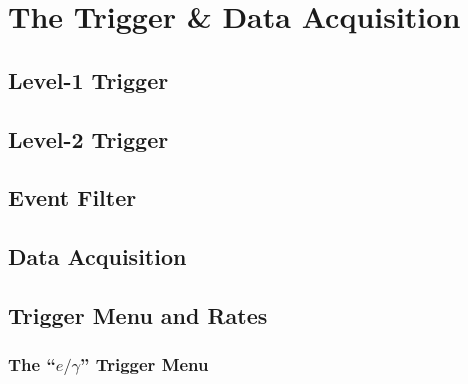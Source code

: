 \chapter{The Trigger \& Data Acquisition}


\section{Level-1 Trigger}
\section{Level-2 Trigger}
\section{Event Filter}

\section{Data Acquisition}

\section{Trigger Menu and Rates}

\subsection{The ``$e/\gamma$'' Trigger Menu} 














